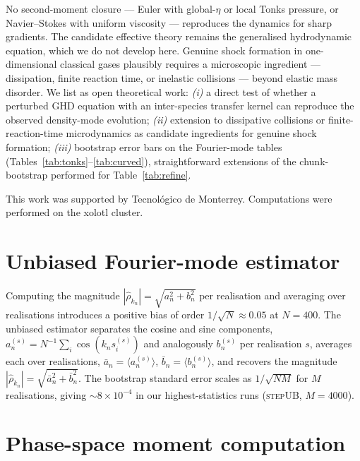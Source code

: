 \documentclass[aps,pre,twocolumn,superscriptaddress,longbibliography,floatfix]{revtex4-2}
\begin{document}
No second-moment closure --- Euler with global-$\eta$ or local
Tonks pressure, or Navier--Stokes with uniform viscosity ---
reproduces the dynamics for sharp gradients. The candidate
effective theory remains the generalised hydrodynamic equation,
which we do not develop here. Genuine shock formation in
one-dimensional classical gases plausibly requires a
microscopic ingredient --- dissipation, finite reaction time, or
inelastic collisions --- beyond elastic mass disorder. We list as open theoretical work:
\emph{(i)} a direct test of whether a perturbed GHD equation
with an inter-species transfer kernel can reproduce the
observed density-mode evolution;
\emph{(ii)} extension to dissipative collisions or
finite-reaction-time microdynamics as candidate ingredients for
genuine shock formation;
\emph{(iii)} bootstrap error bars on the Fourier-mode tables
(Tables~\ref{tab:tonks}--\ref{tab:curved}), straightforward
extensions of the chunk-bootstrap performed for
Table~\ref{tab:refine}.

\begin{acknowledgments}
This work was supported by Tecnol\'ogico de Monterrey.
Computations were performed on the xolotl cluster.
\end{acknowledgments}

\appendix

\section{Unbiased Fourier-mode estimator}\label{app:estimator}

Computing the magnitude $|\hat\rho_{k_n}|=\sqrt{a_n^2+b_n^2}$
per realisation and averaging over realisations introduces a
positive bias of order $1/\sqrt{N}\approx 0.05$ at $N=400$. The
unbiased estimator separates the cosine and sine components,
$a_n^{(s)}=N^{-1}\sum_i \cos(k_n s_i^{(s)})$ and analogously
$b_n^{(s)}$ per realisation $s$, averages each over
realisations, $\bar a_n = \langle a_n^{(s)}\rangle$,
$\bar b_n = \langle b_n^{(s)}\rangle$, and recovers the
magnitude $|\hat\rho_{k_n}| = \sqrt{\bar a_n^2 + \bar b_n^2}$.
The bootstrap standard error scales as
$1/\sqrt{N M}$ for $M$ realisations, giving $\sim 8\times 10^{-4}$
in our highest-statistics runs (\textsc{stepUB}, $M=4000$).

\section{Phase-space moment computation}\label{app:moments}
\end{document}
